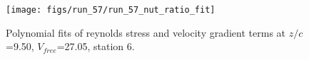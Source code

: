 \begin{figure}[H]
\centering
\texttt{[image: figs/run\_57/run\_57\_nut\_ratio\_fit]}
\caption{Polynomial fits of reynolds stress and velocity gradient terms at $z/c$=9.50, $V_{free}$=27.05, station 6.}
\label{fig:run_57_nut_ratio_fit}
\end{figure}


